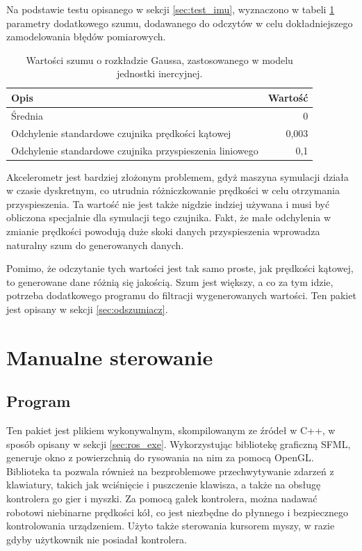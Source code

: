 	Na podstawie testu opisanego w sekcji \ref{sec:test_imu}, wyznaczono w tabeli \ref{tab:imu_noise} parametry dodatkowego szumu, dodawanego do odczytów w celu dokładniejszego zamodelowania błędów pomiarowych.
	
	\begin{table}
		\centering
		\begin{tabular}{l r}
		Opis & Wartość \\
		\hline
		Średnia					&	0 \\
		Odchylenie standardowe czujnika prędkości kątowej	&	0,003 \\
		Odchylenie standardowe czujnika przyspieszenia liniowego	&	0,1 \\
		\end{tabular}
		\caption{Wartości szumu o rozkładzie Gaussa, zastosowanego w modelu jednostki inercyjnej.}
		\label{tab:imu_noise}
	\end{table}
	
	Akcelerometr jest bardziej złożonym problemem, gdyż maszyna symulacji działa w czasie dyskretnym, co utrudnia różniczkowanie prędkości w celu otrzymania przyspieszenia.
	Ta wartość nie jest także nigdzie indziej używana i musi być obliczona specjalnie dla symulacji tego czujnika.
	Fakt, że małe odchylenia w zmianie prędkości powodują duże skoki danych przyspieszenia wprowadza naturalny szum do generowanych danych.
	
	Pomimo, że odczytanie tych wartości jest tak samo proste, jak prędkości kątowej, to generowane dane różnią się jakością.
	Szum jest większy, a co za tym idzie, potrzeba dodatkowego programu do filtracji wygenerowanych wartości.
	Ten pakiet jest opisany w sekcji \ref{sec:odszumiacz}.
	
\section{Manualne sterowanie}
	\subsection{Program}
		Ten pakiet jest plikiem wykonywalnym, skompilowanym ze źródeł w C++, w sposób opisany w sekcji \ref{sec:ros_exe}.
		Wykorzystując bibliotekę graficzną SFML, generuje okno z powierzchnią do rysowania na nim za pomocą OpenGL.
		Biblioteka ta pozwala również na bezproblemowe przechwytywanie zdarzeń z klawiatury, takich jak wciśnięcie i puszczenie klawisza, a także na obsługę kontrolera go gier i myszki.
		Za pomocą gałek kontrolera, można nadawać robotowi niebinarne prędkości kół, co jest niezbędne do płynnego i bezpiecznego kontrolowania urządzeniem.
		Użyto także sterowania kursorem myszy, w razie gdyby użytkownik nie posiadał kontrolera.
		
